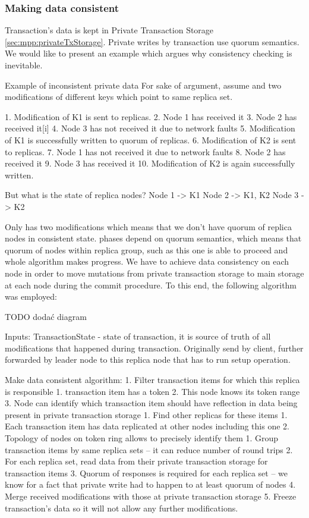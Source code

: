         
\subsubsection{Making data consistent}
Transaction’s data is kept in Private Transaction Storage \ref{sec:mpp:privateTxStorage}. Private writes by transaction use quorum semantics. We would like to present an example which argues why consistency checking is inevitable.


Example of inconsistent private data
For sake of argument, assume  and two modifications of different keys which point to same replica set.


1. Modification of K1 is sent to replicas.
2. Node 1 has received it
3. Node 2 has received it[i]
4. Node 3 has not received it due to network faults
5. Modification of K1 is successfully written to quorum of replicas.
6. Modification of K2 is sent to replicas.
7. Node 1 has not received it due to network faults
8. Node 2 has received it
9. Node 3 has received it
10. Modification of K2 is again successfully written.


But what is the state of replica nodes?
Node 1 -> { K1 }
Node 2 -> { K1, K2 }
Node 3 -> { K2 }


Only  has two modifications which means that we don’t have quorum of replica nodes in consistent state. \paxos phases depend on quorum semantics, which means that quorum of nodes within replica group, such as this one is able to proceed and whole algorithm makes progress. 
We have to achieve data consistency on each node in order to move mutations from private transaction storage to main storage at each node during the commit procedure. To this end, the following algorithm was employed:

TODO dodać diagram

Inputs:
        TransactionState - state of transaction, it is source of truth of all modifications that happened during transaction. Originally send by client, further forwarded by leader node to this replica node that has to run setup operation.


        Make data consistent algorithm:        
1. Filter transaction items for which this replica is responsible
   1. transaction item has a token
   2. This node knows its token range
   3. Node can identify which transaction item should have reflection in data being present in private transaction storage
1. Find other replicas for these items
   1. Each transaction item has data replicated at other nodes including this one
   2. Topology of nodes on token ring allows to precisely identify them
1. Group transaction items by same replica sets -- it can reduce number of round trips
2. For each replica set, read data from their private transaction storage for transaction items
3. Quorum of responses is required for each replica set -- we know for a fact that private write had to happen to at least quorum of nodes
4. Merge received modifications with those at private transaction storage
5. Freeze transaction’s data so it will not allow any further modifications.


